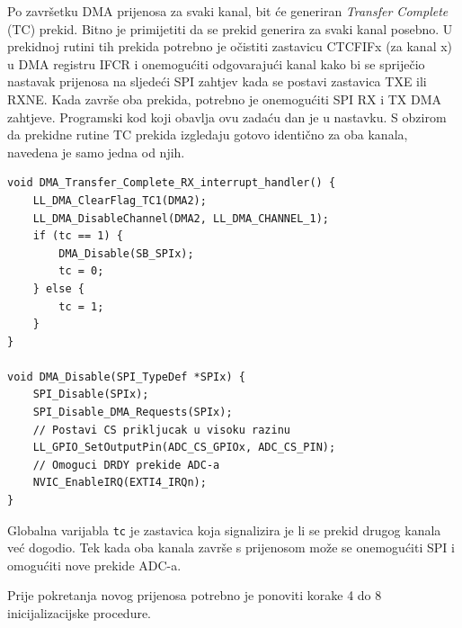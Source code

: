 Po završetku DMA prijenosa za svaki kanal, bit će generiran \textit{Transfer Complete} (TC) prekid. Bitno je primijetiti da se prekid generira za svaki kanal posebno. U prekidnoj rutini tih prekida potrebno je očistiti zastavicu CTCFIFx (za kanal x) u DMA registru IFCR i onemogućiti odgovarajući kanal kako bi se spriječio nastavak prijenosa na sljedeći SPI zahtjev kada se postavi zastavica TXE ili RXNE. Kada završe oba prekida, potrebno je onemogućiti SPI RX i TX DMA zahtjeve. Programski kod koji obavlja ovu zadaću dan je u nastavku. S obzirom da prekidne rutine TC prekida izgledaju gotovo identično za oba kanala, navedena je samo jedna od njih.

\begin{lstlisting}[caption={Prekidna rutina prekida \textit{DMA Transfer Complete}}]
void DMA_Transfer_Complete_RX_interrupt_handler() {
	LL_DMA_ClearFlag_TC1(DMA2);
	LL_DMA_DisableChannel(DMA2, LL_DMA_CHANNEL_1);
	if (tc == 1) {
		DMA_Disable(SB_SPIx);
		tc = 0;
	} else {
		tc = 1;
	}
}

void DMA_Disable(SPI_TypeDef *SPIx) {
	SPI_Disable(SPIx);
	SPI_Disable_DMA_Requests(SPIx);
	// Postavi CS prikljucak u visoku razinu
	LL_GPIO_SetOutputPin(ADC_CS_GPIOx, ADC_CS_PIN);
	// Omoguci DRDY prekide ADC-a
	NVIC_EnableIRQ(EXTI4_IRQn);
}
\end{lstlisting}

Globalna varijabla \texttt{tc} je zastavica koja signalizira je li se prekid drugog kanala već dogodio. Tek kada oba kanala završe s prijenosom može se onemogućiti SPI i omogućiti nove prekide ADC-a.

Prije pokretanja novog prijenosa potrebno je ponoviti korake 4 do 8 inicijalizacijske procedure.

